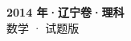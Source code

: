 \documentclass[zihao=-4, a4paper]{ctexart}
\begin{document}
\begin{center}
  {\Large\bfseries 2014 年·辽宁卷·理科}\\[4pt]
  {\large 数学 · 试题版}
\end{center}
\medskip
{}

\end{document}
